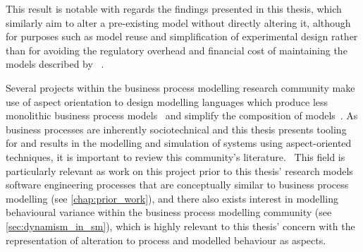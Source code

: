 This result is notable with regards the findings presented in this thesis, which
similarly aim to alter a pre-existing model without directly altering it,
although for purposes such as model reuse and simplification of experimental
design rather than for avoiding the regulatory overhead and financial cost of
maintaining the models described by
\citeauthor{ionescu2009aspect}~\cite{ionescu2009aspect}.







Several projects within the business process modelling research community make
use of aspect orientation to design modelling languages which produce less
monolithic business process models~\cite{Cappelli_AOBPM,da2020implementation}
and simplify the composition of models~\cite{charfi2007ao4bpel}. As business
processes are inherently sociotechnical and this thesis presents tooling for and
results in the modelling and simulation of \sociotechnical systems using
aspect-oriented techniques, it is important to review this community's
literature.~ This field is particularly relevant as work on this project prior to
this thesis' research models software engineering processes that are
conceptually similar to business process modelling (see \cref{chap:prior_work}),
and there also exists interest in modelling behavioural variance within the
business process modelling community (see \cref{sec:dynamism_in_sm}), which is
highly relevant to this thesis' concern with the representation of alteration to
process and modelled behaviour as aspects.


